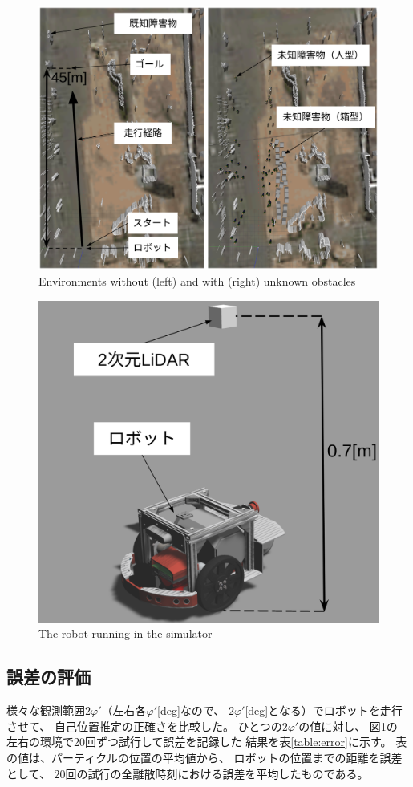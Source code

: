 \documentclass{jarticle}
\begin{document}
\begin{figure}[htbp]
  \centering
   \includegraphics[width=1.0\linewidth]{fig/environment_comparison.png}
	\caption{Environments without (left) and with (right) unknown obstacles}
   \label{fig:つくばチャレンジ人混みシミュレータ}
\end{figure}

\begin{figure}[htbp]
  \centering
   \includegraphics[width=0.5\linewidth]{fig/raspicat_gazebo.png}
   \caption{The robot running in the simulator}
   \label{fig:raspicat}
\end{figure}

\subsection{誤差の評価}


様々な観測範囲$2\varphi'$（左右各$\varphi'$[deg]なので、
$2\varphi'$[deg]となる）でロボットを走行させて、
自己位置推定の正確さを比較した。
ひとつの$2\varphi'$の値に対し、
図\ref{fig:つくばチャレンジ人混みシミュレータ}の
左右の環境で20回ずつ試行して誤差を記録した
結果を表\ref{table:error}に示す。
表の値は、パーティクルの位置の平均値から、
ロボットの位置までの距離を誤差として、
$20$回の試行の全離散時刻における誤差を平均したものである。
\end{document}
